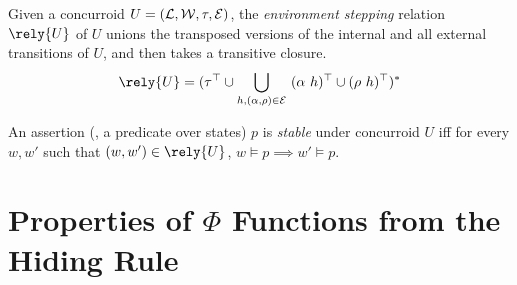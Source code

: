 \begin{definition}
\label{def:rely}

Given a concurroid $U = ({\cal L}, {\cal W}, \tau, {\cal E})$, the
\emph{environment stepping} relation $\rely{U}$ of $U$ unions the
transposed versions of the internal and all external transitions of
$U$, and then takes a transitive closure.
{\small
\[
\rely{U} = (\tau^\top \cup \bigcup_{h, (\alpha, \rho)\in {\cal E}}\ (\alpha\ h)^\top \cup (\rho\ h)^\top)^*
\]}
\end{definition}


\begin{definition}[Stability]
An assertion (\ie, a predicate over states) $p$ is \emph{stable}
under concurroid $U$ iff for every $w, w'$ such that $(w, w') \in
\rely{U}$, $w \models p \implies w' \models p$.
\end{definition}

\begin{comment}
We require two further properties of actions, requiring stability of
the safety and stepping action components wrt. to the associated
concurroid $V$.\an{I separate these, because they are not actually
  implemented in Coq. However, I think that if we impose them, the
  section on logic will be easier to present.}
{\small
\[
\begin{array}{rcl}
\mathsf{safe}_{ST} & : & \mathsf{safe}_a\ i \implies (i, j) \in \mathsf{env\_steps}_V \implies \mathsf{safe}_a\ j\\
\mathsf{step}_{ST} & : & (i, j) \in \mathsf{step}_a \implies (j, k) \in \mathsf{env\_steps}_V \implies \hbox{}\\
                  &   & (i, k) \in \mathsf{step}_a
\end{array}
\]}
\end{comment}


\section{Properties of $\Phi$ Functions from the Hiding Rule}
\label{sec:phi-properties}

